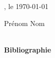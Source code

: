 \documentclass[a4paper,12pt]{report}
\begin{document}
, le \today

\vspace{3cm}

\begin{flushright}
    \begin{minipage}{7cm}
        {\color{gray} Prénom Nom}
    \end{minipage}\hfill
\end{flushright}

\pagebreak

\tableofcontents
\thispagestyle{fancy}

\pagebreak

\begin{center}
    \textsc{\Large }\\[3cm]
    {\huge \bfseries Bibliographie}

    \vspace{1cm}
\end{center}
\end{document}

